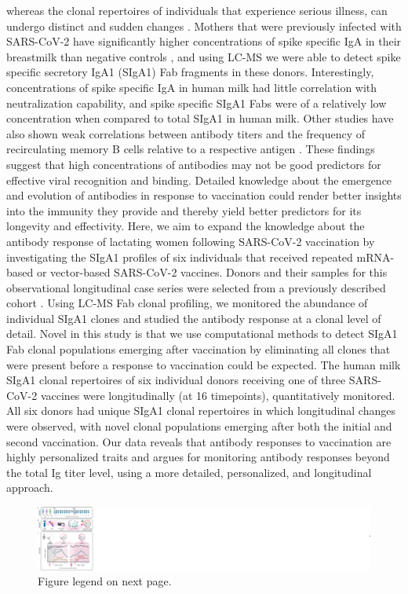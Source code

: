 whereas the clonal repertoires of individuals that experience serious illness, can undergo distinct and sudden changes \cite{bondt2021human, rijswijck2022discriminating}.
Mothers that were previously infected with SARS-CoV-2 have significantly higher concentrations of spike specific IgA in their breastmilk than negative controls \cite{keulen2021human}, and using LC-MS we were able to detect spike specific secretory IgA1 (SIgA1) Fab fragments in these donors. Interestingly, concentrations of spike specific IgA in human milk had little correlation with neutralization capability, and spike specific SIgA1 Fabs were of a relatively low concentration when compared to total SIgA1 in human milk. Other studies have also shown weak correlations between antibody titers and the frequency of recirculating memory B cells relative to a respective antigen \cite{wolf2022antibody}. These findings suggest that high concentrations of antibodies may not be good predictors for effective viral recognition and binding. Detailed knowledge about the emergence and evolution of antibodies in response to vaccination could render better insights into the immunity they provide and thereby yield better predictors for its longevity and effectivity.
Here, we aim to expand the knowledge about the antibody response of lactating women following SARS-CoV-2 vaccination by investigating the SIgA1 profiles of six individuals that received repeated mRNA-based or vector-based SARS-CoV-2 vaccines. Donors and their samples for this observational longitudinal case series were selected from a previously described cohort \cite{juncker2022comparing}. Using LC-MS Fab clonal profiling, we monitored the abundance of individual SIgA1 clones and studied the antibody response at a clonal level of detail. Novel in this study is that we use computational methods to detect SIgA1 Fab clonal populations emerging after vaccination by eliminating all clones that were present before a response to vaccination could be expected. The human milk SIgA1 clonal repertoires of six individual donors receiving one of three SARS-CoV-2 vaccines were longitudinally (at 16 timepoints), quantitatively monitored. All six donors had unique SIgA1 clonal repertoires in which longitudinal changes were observed, with novel clonal populations emerging after both the initial and second vaccination. Our data reveals that antibody responses to vaccination are highly personalized traits and argues for monitoring antibody responses beyond the total Ig titer level, using a more detailed, personalized, and longitudinal approach.
\begin{figure}[!pt]
  \center
  \includegraphics[]{Chapter.4/Figures/f1.png}
  \captionsetup{singlelinecheck = false, format= hang}
  \caption{
    Figure legend on next page.
  }

  \label{fig:fig4.1}
  \vspace{24cm}

\end{figure}

